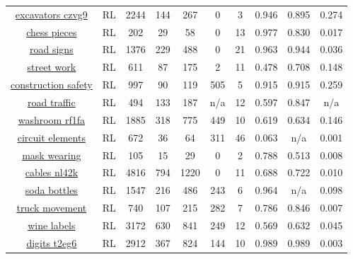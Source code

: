 \begin{longtable}{|| c | c | c c c | c c | c c c ||}
\cline{1-10}
\href{https://app.roboflow.com/roboflow-100/excavators-czvg9/1}{excavators czvg9} & RL & 2244 & 144 & 267 & 0 & 3 & 0.946 & 0.895 & 0.274 \\
\cline{1-10}
\href{https://app.roboflow.com/roboflow-100/chess-pieces-mjzgj/1}{chess pieces} & RL & 202 & 29 & 58 & 0 & 13 & 0.977 & 0.830 & 0.017 \\
\cline{1-10}
\href{https://app.roboflow.com/roboflow-100/road-signs-6ih4y/1}{road signs} & RL & 1376 & 229 & 488 & 0 & 21 & 0.963 & 0.944 & 0.036 \\
\cline{1-10}
\href{https://app.roboflow.com/roboflow-100/street-work/3}{street work} & RL & 611 & 87 & 175 & 2 & 11 & 0.478 & 0.708 & 0.148 \\
\cline{1-10}
\href{https://app.roboflow.com/roboflow-100/construction-safety-gsnvb/1}{construction safety} & RL & 997 & 90 & 119 & 505 & 5 & 0.915 & 0.915 & 0.259 \\
\cline{1-10}
\href{https://app.roboflow.com/roboflow-100/road-traffic/3}{road traffic} & RL & 494 & 133 & 187 & n/a & 12 & 0.597 & 0.847 & n/a \\
\cline{1-10}
\href{https://app.roboflow.com/roboflow-100/washroom-rf1fa/1}{washroom rf1fa} & RL & 1885 & 318 & 775 & 449 & 10 & 0.619 & 0.634 & 0.146 \\
\cline{1-10}
\href{https://app.roboflow.com/roboflow-100/circuit-elements/3}{circuit elements} & RL & 672 & 36 & 64 & 311 & 46 & 0.063 & n/a & 0.001 \\
\cline{1-10}
\href{https://app.roboflow.com/roboflow-100/mask-wearing-608pr/1}{mask wearing} & RL & 105 & 15 & 29 & 0 & 2 & 0.788 & 0.513 & 0.008 \\
\cline{1-10}
\href{https://app.roboflow.com/roboflow-100/cables-nl42k/1}{cables nl42k} & RL & 4816 & 794 & 1220 & 0 & 11 & 0.688 & 0.722 & 0.010 \\
\cline{1-10}
\href{https://app.roboflow.com/roboflow-100/soda-bottles/3}{soda bottles} & RL & 1547 & 216 & 486 & 243 & 6 & 0.964 & n/a & 0.098 \\
\cline{1-10}
\href{https://app.roboflow.com/roboflow-100/truck-movement/3}{truck movement} & RL & 740 & 107 & 215 & 282 & 7 & 0.786 & 0.846 & 0.007 \\
\cline{1-10}
\href{https://app.roboflow.com/roboflow-100/wine-labels/1}{wine labels} & RL & 3172 & 630 & 841 & 249 & 12 & 0.569 & 0.632 & 0.045 \\
\cline{1-10}
\href{https://app.roboflow.com/roboflow-100/digits-t2eg6/1}{digits t2eg6} & RL & 2912 & 367 & 824 & 144 & 10 & 0.989 & 0.989 & 0.003 \\

\end{longtable}
